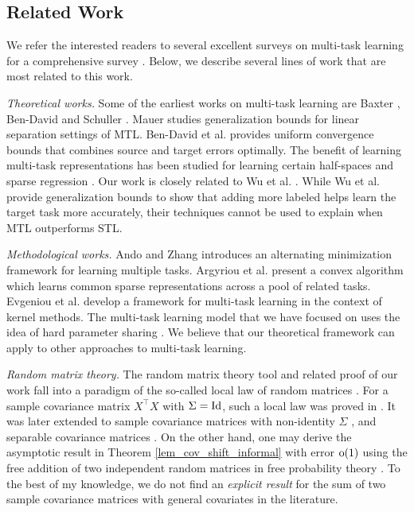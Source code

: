 \subsection{Related Work}

We refer the interested readers to several excellent surveys on multi-task  learning for a comprehensive survey \cite{PY09,R17,ZY17,V20}.
Below, we describe several lines of work that are most related to this work.

\textit{Theoretical works.}
Some of the earliest works on multi-task learning are Baxter \cite{B00}, Ben-David and Schuller \cite{BS03}.
Mauer \cite{M06} studies generalization bounds for linear separation settings of MTL.
Ben-David et al. \cite{BBCK10} provides uniform convergence bounds that combines source and target errors optimally.
The benefit of learning multi-task representations has been studied for learning certain half-spaces \cite{MPR16} and sparse regression \cite{LPTV09,LPVT11}.
Our work is closely related to Wu et al. \cite{WZR20}.
While Wu et al. provide generalization bounds to show that adding more labeled helps learn the target task more accurately, their techniques cannot be used to explain when MTL outperforms STL.

\textit{Methodological works.}
Ando and Zhang \cite{AZ05} introduces an alternating minimization framework for learning multiple tasks.
Argyriou et al. \cite{AEP08} present a convex algorithm which learns common sparse representations across a pool of related tasks.
Evgeniou et al. \cite{EMP05} develop a framework for multi-task learning in the context of kernel methods.
The multi-task learning model that we have focused on uses the idea of hard parameter sharing \cite{C93,KD12,R17}.
We believe that our theoretical framework can apply to other approaches to multi-task learning.

\textit{Random matrix theory.}
The random matrix theory tool and related proof of our work fall into a paradigm of the so-called local law of random matrices \cite{erdos2017dynamical}.
For a sample covariance matrix $X^\top X$ with $\Sigma=\operatorname{Id}$, such a local law was proved in \cite{isotropic}.
It was later extended to sample covariance matrices with non-identity $\Sigma$ \cite{Anisotropic}, and separable covariance matrices \cite{yang2019spiked}. On the other hand, one may derive the asymptotic result in Theorem \ref{lem_cov_shift_informal} with error $\operatorname{o}(1)$ using the free addition of two independent random matrices in free probability theory \cite{nica2006lectures}. To the best of my knowledge, we do not find an {\it explicit result} for the sum of two sample covariance matrices with general covariates in the literature.

